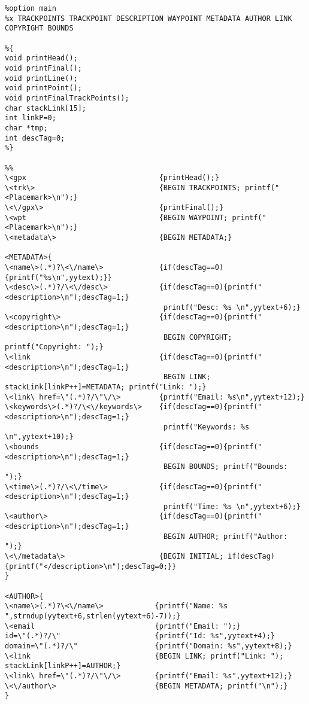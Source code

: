 \documentclass{llncs}
\begin{document}
\small
\begin{changemargin}{-4cm}{0cm}
\begin{verbatim}
%option main
%x TRACKPOINTS TRACKPOINT DESCRIPTION WAYPOINT METADATA AUTHOR LINK COPYRIGHT BOUNDS

%{
void printHead();
void printFinal();
void printLine();
void printPoint();
void printFinalTrackPoints();
char stackLink[15];
int linkP=0;
char *tmp;
int descTag=0;
%}

%%
\<gpx                               {printHead();}
\<trk\>                             {BEGIN TRACKPOINTS; printf("<Placemark>\n");}
\<\/gpx\>                           {printFinal();}
\<wpt                               {BEGIN WAYPOINT; printf("<Placemark>\n");}
\<metadata\>                        {BEGIN METADATA;}

<METADATA>{
\<name\>(.*)?\<\/name\>             {if(descTag==0){printf("%s\n",yytext);}}
\<desc\>(.*)?/\<\/desc\>            {if(descTag==0){printf("<description>\n");descTag=1;}
                                     printf("Desc: %s \n",yytext+6);}
\<copyright\>                       {if(descTag==0){printf("<description>\n");descTag=1;} 
                                     BEGIN COPYRIGHT; printf("Copyright: ");}
\<link                              {if(descTag==0){printf("<description>\n");descTag=1;} 
                                     BEGIN LINK; stackLink[linkP++]=METADATA; printf("Link: ");}
\<link\ href=\"(.*)?/\"\/\>         {printf("Email: %s\n",yytext+12);}
\<keywords\>(.*)?/\<\/keywords\>    {if(descTag==0){printf("<description>\n");descTag=1;} 
                                     printf("Keywords: %s \n",yytext+10);}
\<bounds                            {if(descTag==0){printf("<description>\n");descTag=1;} 
                                     BEGIN BOUNDS; printf("Bounds: ");}
\<time\>(.*)?/\<\/time\>            {if(descTag==0){printf("<description>\n");descTag=1;} 
                                     printf("Time: %s \n",yytext+6);}
\<author\>                          {if(descTag==0){printf("<description>\n");descTag=1;} 
                                     BEGIN AUTHOR; printf("Author: ");}
\<\/metadata\>                      {BEGIN INITIAL; if(descTag){printf("</description>\n");descTag=0;}}
}

<AUTHOR>{
\<name\>(.*)?\<\/name\>            {printf("Name: %s ",strndup(yytext+6,strlen(yytext+6)-7));}
\<email                            {printf("Email: ");}
id=\"(.*)?/\"                      {printf("Id: %s",yytext+4);}
domain=\"(.*)?/\"                  {printf("Domain: %s",yytext+8);}
\<link                             {BEGIN LINK; printf("Link: "); stackLink[linkP++]=AUTHOR;}
\<link\ href=\"(.*)?/\"\/\>        {printf("Email: %s",yytext+12);}
\<\/author\>                       {BEGIN METADATA; printf("\n");}
}


\end{verbatim}
\end{changemargin}
\end{document}
